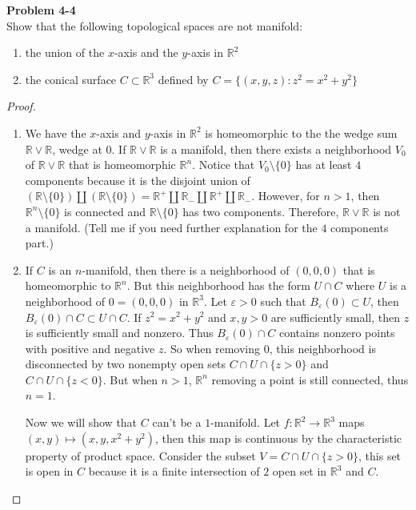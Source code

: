\documentclass[12pt, a4paper]{article}
\theoremstyle{plain}
\newcommand{\R}{\mathbb{R}}
\def\epsilon{\varepsilon}
\newenvironment{problem}[2][Problem]
    { \begin{mdframed}[backgroundcolor=gray!20] \textbf{#1 #2} \\}
    {  \end{mdframed}}
\begin{document}
\begin{problem}{4-4}
Show that the following topological spaces are not manifold:
\begin{enumerate}[label=(\alph*)]
\item the union of the $x$-axis and the $y$-axis in $\R^2$

\item the conical surface $C\subset \R^3$ defined by $C=\{(x,y,z):z^2=x^2+y^2\}$
\end{enumerate}
\end{problem}
	\begin{proof}
	\hfill
	\begin{enumerate}[label=(\alph*)]
	\item We have the $x$-axis and $y$-axis in $\R^2$ is homeomorphic to the the wedge sum $\R\vee \R$, wedge at $0$. If $\R\vee \R$ is a manifold, then there exists a neighborhood $V_0$ of $\R\vee \R$ that is homeomorphic $\R^n$. Notice that $V_0\setminus\{0\}$ has at least $4$ components because it is the disjoint union of $(\R\setminus\{0\})\coprod (\R\setminus\{0\}) = \R^+\coprod\R_-\coprod\R^+\coprod\R_-$. However, for $n>1$, then $\R^n\setminus \{0\}$ is connected and $\R\setminus\{0\}$ has two components. Therefore, $\R\vee\R$ is not a manifold. (Tell me if you need further explanation for the $4$ components part.)
	\item If $C$ is an $n$-manifold, then there is a neighborhood of $(0,0,0)$ that is homeomorphic to $\R^n$. But this neighborhood has the form $U\cap C$ where $U$ is a neighborhood of $0 = (0,0,0)$ in $\R^3$. Let $\epsilon >0$ such that $B_\epsilon(0)\subset U$, then $B_\epsilon(0)\cap C\subset U\cap C$. If $z^2=x^2+y^2$ and $x,y>0$ are sufficiently small, then $z$ is sufficiently small and nonzero. Thus $B_\epsilon(0)\cap C$ contains nonzero points with positive and negative $z$. So when removing $0$, this neighborhood is disconnected by two nonempty open sets $C\cap U\cap \{z>0\}$ and $C\cap U\cap \{z<0\}$. But when $n>1$, $\R^n$ removing a point is still connected, thus $n=1$. 
	
	Now we will show that $C$ can't be a $1$-manifold. Let $f:\R^2\rightarrow \R^3$ maps $(x,y)\mapsto (x,y,x^2+y^2)$, then this map is continuous by the characteristic property of product space. Consider the subset $V = C\cap U\cap \{z>0\}$, this set is open in $C$ because it is a finite intersection of $2$ open set in $\R^3$ and $C$. 
	\end{enumerate}
	\end{proof}
\end{document}
